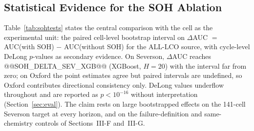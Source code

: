 \begin{table}[!t]
\caption{Arm B Recovery at $k=5$ on Severson Without SOH, $H=20$. Recovery Ratio Uses the Within-LCO Ceiling; Retention Is the LCO-Holdout AUC Before and After the Update. \textsuperscript{*}Ratio above 1.0 is a ceiling-mismatch artifact, not super-ceiling recovery (see text).}
\label{tab:rec-r2}
\centering
{}
\end{table}

\subsection{Statistical Evidence for the SOH Ablation}
Table~\ref{tab:sohtests} states the central comparison with the cell as the experimental unit: the paired cell-level bootstrap interval on $\Delta$AUC $=$ AUC(with SOH) $-$ AUC(without SOH) for the ALL-LCO source, with cycle-level DeLong $p$-values as secondary evidence. On Severson, $\Delta$AUC reaches @@SOH_DELTA_SEV_XGB@@ (XGBoost, $H{=}20$) with the interval far from zero; on Oxford the point estimates agree but paired intervals are undefined, so Oxford contributes directional consistency only. DeLong values underflow throughout and are reported as $p{<}10^{-16}$ without interpretation (Section~\ref{sec:eval}). The claim rests on large bootstrapped effects on the 141-cell Severson target at every horizon, and on the failure-definition and same-chemistry controls of Sections~III-F and~III-G.

\begin{table}[!t]
\caption{SOH Ablation Evidence (ALL-LCO Source): Pooled AUC With and Without SOH, Paired Cell-Level Bootstrap 95\% CI on the Difference (Primary), and Cycle-Level DeLong $p$-Value (Secondary; Inflated by Within-Cell Correlation).}
\label{tab:sohtests}
\centering
{}
\end{table}

